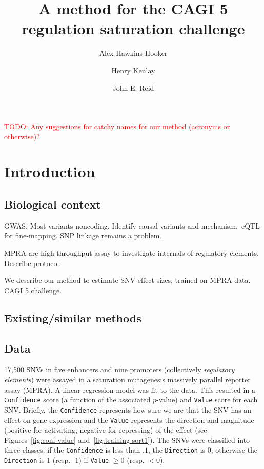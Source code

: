 \documentclass{article}
\author[1]{Alex Hawkins-Hooker}
\author[2]{Henry Kenlay}
\author[3, 4]{John E. Reid}
\affil[1]{\footnotesize \todo{add}}
\affil[2]{\footnotesize \todo{add}}
\affil[3]{\footnotesize MRC Biostatistics Unit, University of Cambridge, Cambridge, UK}
\affil[4]{\footnotesize Alan Turing Institute, British Library, London, UK}
\title{A method for the CAGI 5 regulation saturation challenge}
\makeatletter
\newcommand{\todo}[1]{\textcolor{red}{TODO\@: #1}}
\makeatother
\begin{document}
\maketitle


\todo{Any suggestions for catchy names for our method (acronyms or otherwise)?}


\section*{Introduction}

\subsection*{Biological context}

GWAS\@. Most variants noncoding. Identify causal variants and mechanism.\ eQTL for
fine-mapping. SNP linkage remains a problem.

MPRA are high-throughput assay to investigate internals of regulatory elements.
Describe protocol.

We describe our method to estimate SNV effect sizes, trained on MPRA data. CAGI
5 challenge.


\subsection*{Existing/similar methods}


\subsection*{Data}

17,500 SNVs in five enhancers and nine promoters (collectively \emph{regulatory
elements}) were assayed in a saturation mutagenesis massively parallel reporter
assay (MPRA). A linear regression model was fit to the data. This resulted in a
\texttt{Confidence} score (a function of the associated $p$-value) and
\texttt{Value} score for each SNV\@. Briefly, the \texttt{Confidence} represents
how sure we are that the SNV has an effect on gene expression and the
\texttt{Value} represents the direction and magnitude (positive for activating,
negative for repressing) of the effect (see Figures~\ref{fig:conf-value}
and~\ref{fig:training-sort1}). The SNVs were classified into three classes: if
the \texttt{Confidence} is less than $.1$, the \texttt{Direction} is 0; otherwise
the \texttt{Direction} is 1 (resp. -1) if \texttt{Value} $\ge 0$ (resp. $< 0$).
\end{document}
